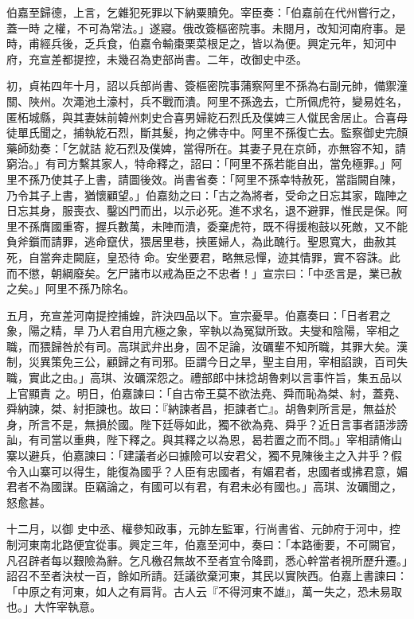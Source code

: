 \begin{pinyinscope}
 伯嘉至歸德，上言，乞雜犯死罪以下納粟贖免。宰臣奏：「伯嘉前在代州嘗行之，蓋一時
 之權，不可為常法。」遂寢。俄改簽樞密院事。未閱月，改知河南府事。是時，甫經兵後，乏兵食，伯嘉令輸棗栗菜根足之，皆以為便。興定元年，知河中府，充宣差都提控，未幾召為吏部尚書。二年，改御史中丞。



 初，貞祐四年十月，詔以兵部尚書、簽樞密院事蒲察阿里不孫為右副元帥，備禦潼關、陜州。次澠池土濠村，兵不戰而潰。阿里不孫逸去，亡所佩虎符，變易姓名，匿柘城縣，與其妻妹前韓州刺史合喜男婦紇石烈氏及僕婢三人僦民舍居止。合喜母徒單氏聞之，捕執紇石烈，斷其髮，拘之佛寺中。阿里不孫復亡去。監察御史完顏藥師劾奏：「乞就詰
 紇石烈及僕婢，當得所在。其妻子見在京師，亦無容不知，請窮治。」有司方繫其家人，特命釋之，詔曰：「阿里不孫若能自出，當免極罪。」阿里不孫乃使其子上書，請圖後效。尚書省奏：「阿里不孫幸特赦死，當詣闕自陳，乃令其子上書，猶懷顧望。」伯嘉劾之曰：「古之為將者，受命之日忘其家，臨陣之日忘其身，服喪衣、鑿凶門而出，以示必死。進不求名，退不避罪，惟民是保。阿里不孫膺國重寄，握兵數萬，未陣而潰，委棄虎符，既不得援枹鼓以死敵，又不能負斧鑕而請罪，逃命竄伏，猥居里巷，挾匿婦人，為此醜行。聖恩寬大，曲赦其死，自當奔走闕庭，皇恐待
 命。安坐要君，略無忌憚，迹其情罪，實不容誅。此而不懲，朝綱廢矣。乞尸諸市以戒為臣之不忠者！」宣宗曰：「中丞言是，業已赦之矣。」阿里不孫乃除名。



 五月，充宣差河南提控捕蝗，許決四品以下。宣宗憂旱。伯嘉奏曰：「日者君之象，陽之精，旱乃人君自用亢極之象，宰執以為冤獄所致。夫燮和陰陽，宰相之職，而猥歸咎於有司。高琪武弁出身，固不足論，汝礪輩不知所職，其罪大矣。漢制，災異策免三公，顧歸之有司邪。臣謂今日之旱，聖主自用，宰相諂諛，百司失職，實此之由。」高琪、汝礪深怨之。禮部郎中抹捻胡魯剌以言事忤旨，集五品以上官顯責
 之。明日，伯嘉諫曰：「自古帝王莫不欲法堯、舜而恥為桀、紂，蓋堯、舜納諫，桀、紂拒諫也。故曰：『納諫者昌，拒諫者亡』。胡魯剌所言是，無益於身，所言不是，無損於國。陛下廷辱如此，獨不欲為堯、舜乎？近日言事者語涉謗訕，有司當以重典，陛下釋之。與其釋之以為恩，曷若置之而不問。」宰相請脩山寨以避兵，伯嘉諫曰：「建議者必曰據險可以安君父，獨不見陳後主之入井乎？假令入山寨可以得生，能復為國乎？人臣有忠國者，有媚君者，忠國者或拂君意，媚君者不為國謀。臣竊論之，有國可以有君，有君未必有國也。」高琪、汝礪聞之，怒愈甚。



 十二月，以御
 史中丞、權參知政事，元帥左監軍，行尚書省、元帥府于河中，控制河東南北路便宜從事。興定三年，伯嘉至河中，奏曰：「本路衝要，不可闕官，凡召辟者每以艱險為辭。乞凡檄召無故不至者宜令降罰，悉心幹當者視所歷升遷。」詔召不至者決杖一百，餘如所請。廷議欲棄河東，其民以實陜西。伯嘉上書諫曰：「中原之有河東，如人之有肩背。古人云『不得河東不雄』，萬一失之，恐未易取也。」大忤宰執意。




\end{pinyinscope}
